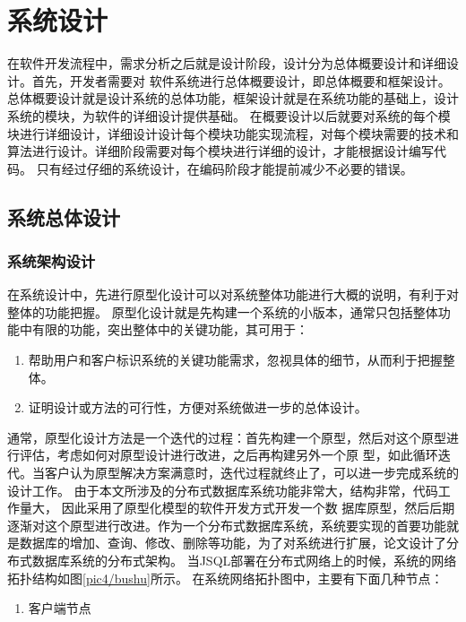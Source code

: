 
\chapter{系统设计}
在软件开发流程中，需求分析之后就是设计阶段，设计分为总体概要设计和详细设计。首先，开发者需要对
软件系统进行总体概要设计，即总体概要和框架设计。总体概要设计就是设计系统的总体功能，框架设计就是在系统功能的基础上，设计系统的模块，为软件的详细设计提供基础。
在概要设计以后就要对系统的每个模块进行详细设计，详细设计设计每个模块功能实现流程，对每个模块需要的技术和算法进行设计。详细阶段需要对每个模块进行详细的设计，才能根据设计编写代码。
只有经过仔细的系统设计，在编码阶段才能提前减少不必要的错误。
\section{系统总体设计}
\subsection{系统架构设计}
在系统设计中，先进行原型化设计可以对系统整体功能进行大概的说明，有利于对整体的功能把握。
原型化设计就是先构建一个系统的小版本，通常只包括整体功能中有限的功能，突出整体中的关键功能，其可用于：
\begin{enumerate}
	\item 帮助用户和客户标识系统的关键功能需求，忽视具体的细节，从而利于把握整体。
	\item 证明设计或方法的可行性，方便对系统做进一步的总体设计。
\end{enumerate}
通常，原型化设计方法是一个迭代的过程：首先构建一个原型，然后对这个原型进行评估，考虑如何对原型设计进行改进，之后再构建另外一个原
型，如此循环迭代。当客户认为原型解决方案满意时，迭代过程就终止了，可以进一步完成系统的设计工作。
由于本文所涉及的分布式数据库系统功能非常大，结构非常，代码工作量大，
因此采用了原型化模型的软件开发方式开发一个数
据库原型，然后后期逐渐对这个原型进行改进。作为一个分布式数据库系统，系统要实现的首要功能就是数据库的增加、查询、修改、删除等功能，为了对系统进行扩展，论文设计了分布式数据库系统的分布式架构。
当JSQL部署在分布式网络上的时候，系统的网络拓扑结构如图\ref{pic4/bushu}所示。
在系统网络拓扑图中，主要有下面几种节点：


	\begin{enumerate}
		\item 客户端节点
	\end{enumerate}

